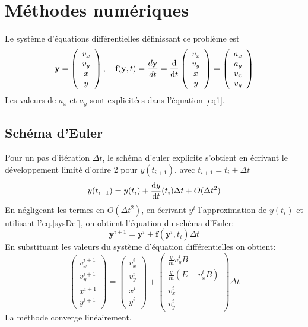 \documentclass[a4paper,12pt,oneside]{article}
\def \be {\begin{equation}}
\def \ee {\end{equation}}
\def \dd  {{\rm d}}
\begin{document}
\newpage
\section{Méthodes numériques}
Le système d'équations différentielles définissant ce problème est
\be \label{sysDef}
\textbf{y} =  \left( \begin{array}{c} v_x \\ v_y \\ x \\ y \end{array} \right) , \quad \textbf{f}(\textbf{y},t)=\frac{d\textbf{y}}{dt}= \frac{\dd }{\dd t}\left( \begin{array}{c} v_x \\ v_y \\ x \\ y \end{array} \right) = \left( \begin{array}{c} a_x \\ a_y \\ v_x \\ v_y \end{array} \right)
\ee
Les valeurs de $a_x$ et $a_y$ sont explicitées dans l'équation \eqref{eq1}.

\subsection{Schéma d'Euler \cite{notesDeCours}}
Pour un pas d'itération $\Delta t$, le schéma d'euler explicite  s'obtient en écrivant le développement limité d'ordre 2 pour $y(t_{i+1})$, avec $t_{i+1} = t_{i} + \Delta t$
\be
y(t_{i+1})=y(t_{i})+ \frac{\dd y}{\dd t}(t_i)\Delta t+O(\Delta t^2)
\ee
En négligeant les termes en $O(\Delta t^2)$, en écrivant $y^{i}$ l'approximation de $y(t_{i})$ et utilisant l'eq.\ref{sysDef}, on obtient l'équation du schéma d'Euler:
\be 
\textbf{y}^{i+1}=\textbf{y}^{i}+\textbf{f}(\textbf{y}^i,t_i)\Delta t
\ee
En substituant les valeurs du système d'équation différentielles on obtient:
\be
\left( \begin{array}{c} v_x^{i+1} \\ v_y^{i+1} \\ x^{i+1} \\ y^{i+1} \end{array} \right) =\left( \begin{array}{c} v_x^{i} \\ v_y^{i} \\ x^{i} \\ y^{i} \end{array} \right)
+ \left( \begin{array}{c}
   \frac{q}{m} v_y^{i} B\\ \frac{q}{m} (E-v_x^{i} B) \\ 
   v_x^{i} \\ v_y^{i}
\end{array} \right)\Delta t
\ee
La méthode converge linéairement.
\end{document}
